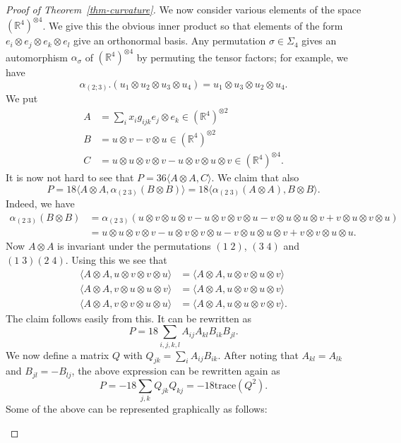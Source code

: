 \documentclass[reqno]{amsart}
\newcommand{\Sg}        {\Sigma}
\newcommand{\al}        {\alpha}
\newcommand{\sg}        {\sigma}
\newcommand{\R}         {{\mathbb{R}}}
\newcommand{\ip}[1]     {\langle #1\rangle}
\newcommand{\ot}        {\otimes}
\renewcommand{\:}{\colon}
\theoremstyle{definition}
\begin{document}
\begin{proof}[Proof of Theorem~\ref{thm-curvature}]
 We now consider various elements of the space $(\R^4)^{\ot 4}$.  We
 give this the obvious inner product so that elements of the form
 $e_i\ot e_j\ot e_k\ot e_l$ give an orthonormal basis.  Any
 permutation $\sg\in\Sg_4$ gives an automorphism $\al_\sg$ of
 $(\R^4)^{\ot 4}$ by permuting the tensor factors; for example, we have
 \[ \al_{(2;3)}.(u_1\ot u_2\ot u_3\ot u_4) =
         u_1\ot u_3\ot u_2\ot u_4.
 \]
 We put
 \begin{align*}
  A &= \sum_ix_ig_{ijk}e_j\ot e_k\in(\R^4)^{\ot 2} \\
  B &= u\ot v - v\ot u\in(\R^4)^{\ot 2} \\
  C &= u\ot u\ot v\ot v-u\ot v\ot u\ot v \in (\R^4)^{\ot 4}.
 \end{align*}
 It is now not hard to see that $P=36\ip{A\ot A,C}$.  We claim that
 also
 \[ P = 18\ip{A\ot A,\al_{(2\;3)}(B\ot B)}
      = 18\ip{\al_{(2\;3)}(A\ot A),B\ot B}.
 \]
 Indeed, we have
 \begin{align*}
  \al_{(2\;3)}(B\ot B) &=
   \al_{(2\;3)}(u\ot v\ot u\ot v -
                u\ot v\ot v\ot u -
                v\ot u\ot u\ot v +
                v\ot u\ot v\ot u) \\
   &= u\ot u\ot v\ot v -
      u\ot v\ot v\ot u -
      v\ot u\ot u\ot v +
      v\ot v\ot u\ot u.
 \end{align*}
 Now $A\ot A$ is invariant under the permutations $(1\;2)$, $(3\;4)$
 and $(1\;3)(2\;4)$.  Using this we see that
 \begin{align*}
  \ip{A\ot A,u\ot v\ot v\ot u} &= \ip{A\ot A,u\ot v\ot u\ot v} \\
  \ip{A\ot A,v\ot u\ot u\ot v} &= \ip{A\ot A,u\ot v\ot u\ot v} \\
  \ip{A\ot A,v\ot v\ot u\ot u} &= \ip{A\ot A,u\ot u\ot v\ot v}.
 \end{align*}
 The claim follows easily from this.  It can be rewritten as
 \[ P = 18\sum_{i,j,k,l} A_{ij}A_{kl}B_{ik}B_{jl}. \]
 We now define a matrix $Q$ with $Q_{jk}=\sum_iA_{ij}B_{ik}$.  After
 noting that $A_{kl}=A_{lk}$ and $B_{jl}=-B_{lj}$, the
 above expression can be rewritten again as
 \[ P=-18\sum_{j,k}Q_{jk}Q_{kj} = -18\text{trace}(Q^2). \]
 Some of the above can be represented graphically as follows:
 \begin{center}
\end{center}
\end{proof}
\end{document}
